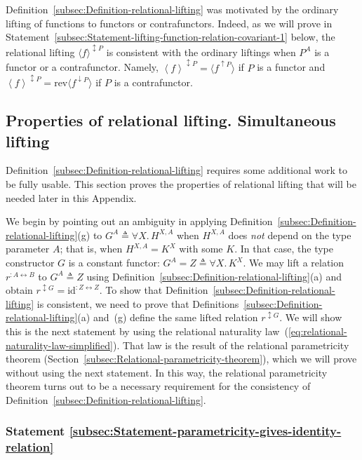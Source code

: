 Definition~\ref{subsec:Definition-relational-lifting} was motivated
by the ordinary lifting of functions to functors or contrafunctors.
Indeed, as we will prove in Statement~\ref{subsec:Statement-lifting-function-relation-covariant-1}
below, the relational lifting $\langle f\rangle^{\updownarrow P}$
is consistent with the ordinary liftings when $P^{A}$ is a functor
or a contrafunctor. Namely, $\left<f\right>^{\updownarrow P}=\langle f^{\uparrow P}\rangle$
if $P$ is a functor and $\left<f\right>^{\updownarrow P}=\text{rev}\langle f^{\downarrow P}\rangle$
if $P$ is a contrafunctor. 

\subsection{Properties of relational lifting. Simultaneous lifting}

Definition~\ref{subsec:Definition-relational-lifting} requires some
additional work to be fully usable. This section proves the properties
of relational lifting that will be needed later in this Appendix.

We begin by pointing out an ambiguity in applying Definition~\ref{subsec:Definition-relational-lifting}(g)
to $G^{A}\triangleq\forall X.\,H^{X,A}$ when $H^{X,A}$ does \emph{not}
depend on the type parameter $A$; that is, when $H^{X,A}=K^{X}$
with some $K$. In that case, the type constructor $G$ is a constant
functor: $G^{A}=Z\triangleq\forall X.\,K^{X}$. We may lift a relation
$r^{:A\leftrightarrow B}$ to $G^{A}\triangleq Z$ using Definition~\ref{subsec:Definition-relational-lifting}(a)
and obtain $r^{\updownarrow G}=\text{id}^{:Z\leftrightarrow Z}$.
To show that Definition~\ref{subsec:Definition-relational-lifting}
is consistent, we need to prove that Definitions~\ref{subsec:Definition-relational-lifting}(a)
and~(g) define the same lifted relation $r^{\updownarrow G}$. We
will show this is the next statement by using the relational naturality
law~(\ref{eq:relational-naturality-law-simplified}). That law is
the result of the relational parametricity theorem (Section~\ref{subsec:Relational-parametricity-theorem}),
which we will prove without using the next statement. In this way,
the relational parametricity theorem turns out to be a necessary requirement
for the consistency of Definition~\ref{subsec:Definition-relational-lifting}.

\subsubsection{Statement \label{subsec:Statement-parametricity-gives-identity-relation}\ref{subsec:Statement-parametricity-gives-identity-relation}}

